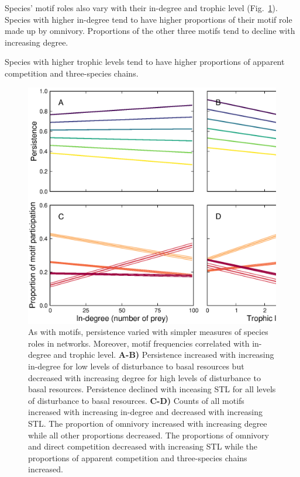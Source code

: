 \documentclass[12pt]{article}
\begin{document}
\begin{spacing}{2.0}
            Species' motif roles also vary with their in-degree and trophic level (Fig.~\ref{fig:motifs_vs_TL_and_deg}).
            Species with higher in-degree tend to have higher proportions of their motif role made up by omnivory. Proportions of the other three motifs tend to decline with increasing degree.
            
            Species with higher trophic levels tend to have higher proportions of apparent competition and three-species chains. 
            

            \begin{figure}
                \centering
                \includegraphics[width=\textwidth]{figures/roles_vs_TL.eps}
                \caption{As with motifs, persistence varied with simpler measures of species roles in networks. Moreover, motif frequencies correlated with in-degree and trophic level. \textbf{A-B)} Persistence increased with increasing in-degree for low levels of disturbance to basal resources but decreased with increasing degree for high levels of disturbance to basal resources.
                Persistence declined with inceasing STL for all levels of disturbance to basal resources.
                \textbf{C-D)} Counts of all motifs increased with increasing in-degree and decreased with increasing STL. The proportion of omnivory increased with increasing degree while all other proportions decreased. The proportions of omnivory and direct competition decreased with increasing STL while the proportions of apparent competition and three-species chains increased.}
                \label{fig:motifs_vs_TL_and_deg}
            \end{figure}


\end{spacing}
\end{document}
